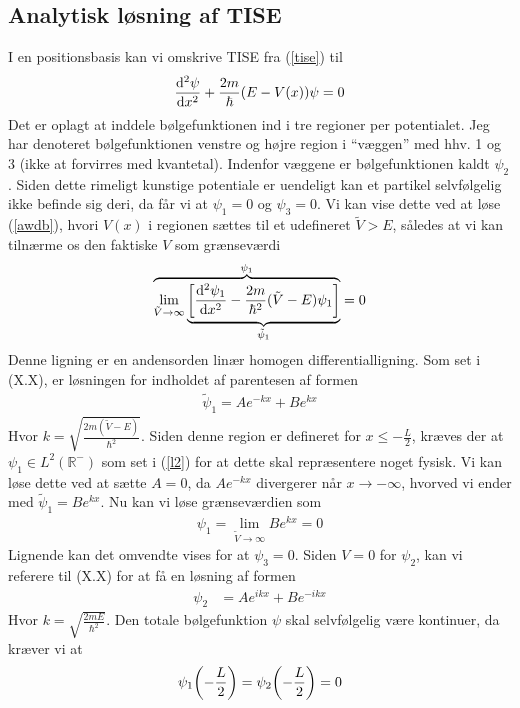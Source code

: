 \documentclass[12pt]{article}
\theoremstyle{definition}
\theoremstyle{remark}
\theoremstyle{definition}
\numberwithin{equation}{section}
\begin{document}
\subsection{Analytisk løsning af TISE}
I en positionsbasis kan vi omskrive TISE fra (\ref{tise}) til
\begin{align}
     \label{awdb}
    \dv[2]{\psi}{x}+\frac{2m}{\hbar}(E-V(x))\psi = 0
\end{align}
Det er oplagt at inddele bølgefunktionen ind i tre regioner per potentialet. Jeg har denoteret bølgefunktionen venstre og højre region i ``væggen'' med hhv. 1 og 3 (ikke at forvirres med kvantetal). Indenfor væggene er bølgefunktionen kaldt $\psi_2$. Siden dette rimeligt kunstige potentiale er uendeligt kan et partikel selvfølgelig ikke befinde sig deri, da får vi at $\psi_1=0$ og $\psi_3=0$. Vi kan vise dette ved at løse (\ref{awdb}), hvori $V(x)$ i regionen sættes til et udefineret $\tilde V>E$, således at vi kan tilnærme os den faktiske $V$ som grænseværdi
\begin{align}
    \overbrace{
    \lim_{\tilde V\rightarrow \infty} \underbrace{\qty[\dv[2]{\psi_1}{x}-\frac{2m}{\hbar^2}(\tilde V-E)\psi_1]}_{\tilde \psi_1}}^{\psi_1} = 0
\end{align}
Denne ligning er en andensorden linær homogen differentialligning. Som set i (X.X), er løsningen for indholdet af parentesen af formen
\begin{align}
    \tilde \psi_1 = Ae^{-kx}+Be^{kx}
\end{align}
Hvor $\displaystyle k = \sqrt{\frac{2m(\tilde V-E)}{\hbar^2}}$. Siden denne region er defineret for $x\leq-\frac{L}{2}$, kræves der at $\psi_1\in L^2(\mathbb R^-)$ som set i (\ref{l2}) for at dette skal repræsentere noget fysisk. Vi kan løse dette ved at sætte $A=0$, da $Ae^{-kx}$ divergerer når $x\to -\infty$, hvorved vi ender med $\tilde \psi_1=Be^{kx}$. Nu kan vi løse grænseværdien som
\begin{align}
    \psi_1 = \lim_{\tilde V\to \infty } Be^{kx} = 0
\end{align}
Lignende kan det omvendte vises for at $\psi_3=0$. Siden $V=0$ for $\psi_2$, kan vi referere til (X.X) for at få en løsning af formen
\begin{align}
\label{mid}
    \psi_2 &= Ae^{ikx}+Be^{-ikx}
\end{align}
Hvor $\displaystyle k = \sqrt{\frac{2mE}{\hbar^2}}$. Den totale bølgefunktion $\psi$ skal selvfølgelig være kontinuer, da kræver vi at
\begin{align}
\label{betingelsea}
    \psi_1\qty(-\frac{L}{2})=\psi_2\qty(-\frac{L}{2})=0
\end{align}
\end{document}

